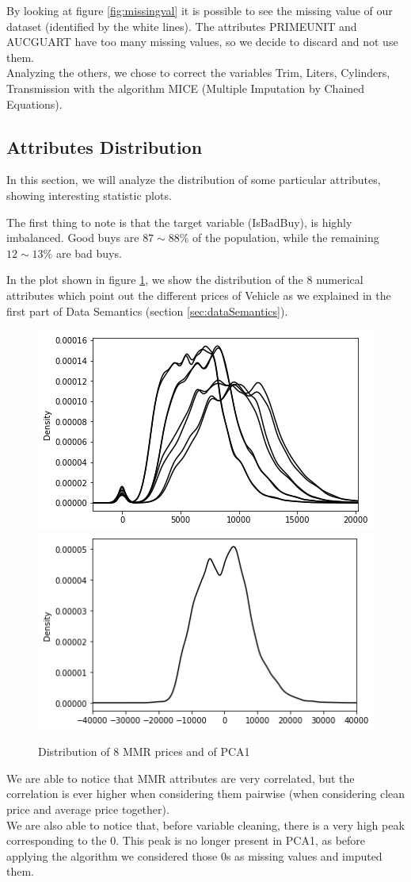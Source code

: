 \documentclass{article}
\begin{document}
	By looking at figure \ref{fig:missingval} it is possible to see the missing value of our dataset (identified by the white lines). The attributes PRIMEUNIT and AUCGUART have too many missing values, so we decide to discard and not use them.\\
	
	
	Analyzing the others, we chose to correct the variables Trim, Liters, Cylinders, Transmission with the algorithm MICE (Multiple Imputation by Chained Equations).
	
	
	
	\subsection{Attributes Distribution}
	\label{sec:attrDistr}
	In this section, we will analyze the distribution of some particular attributes, showing interesting statistic plots.
	
	The first thing to note is that the target variable (IsBadBuy), is highly imbalanced. Good buys are $87\sim88 \%$ of the population, while the remaining $12\sim13 \%$ are bad buys.
	
	In the plot shown in figure \ref{fig:mmr}, we show the distribution of the 8 numerical attributes which point out the different prices of Vehicle as we explained in the first part of Data Semantics (section \ref{sec:dataSemantics}). 
	\begin{figure}[H]
		\centering
		\includegraphics[width=.4\textwidth]{index}\hfill
		\includegraphics[width=.4\textwidth]{PCA1}
		\caption{Distribution of 8 MMR prices and of PCA1}
		\label{fig:mmr}
	\end{figure}
	
	We are able to notice that MMR attributes are very correlated, but the correlation is ever higher when considering them pairwise (when considering clean price and average price together). \\
	We are also able to notice that, before variable cleaning, there is a very high peak corresponding to the 0. This peak is no longer present in PCA1, as before applying the algorithm we considered those 0s as missing values and imputed them. 
	
\end{document}
